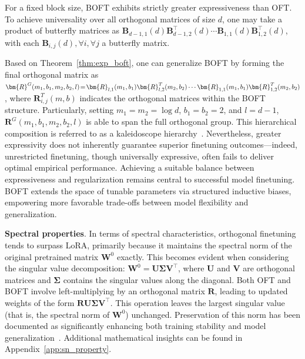 \begin{theorem}\label{thm:exp_boft}
    For a fixed block size, BOFT exhibits strictly greater expressiveness than OFT. To achieve universality over all orthogonal matrices of size $d$, one may take a product of butterfly matrices as $\bm{B}_{d-1,1}(d)\bm{B}^\top_{d-1,2}(d)\cdots\bm{B}_{1,1}(d)\bm{B}^\top_{1,2}(d)$, with each $\bm{B}_{i,j}(d),\forall i,\forall j$ a butterfly matrix.
\end{theorem}

Based on Theorem~\ref{thm:exp_boft}, one can generalize BOFT by forming the final orthogonal matrix as $\thickmuskip=2mu \medmuskip=2mu \bm{R}^G(m_1,b_1,m_2,b_2,l)=\bm{R}_{l,1}(m_1,b_1)\bm{R}_{l,2}^T(m_2,b_2)\cdots\bm{R}_{1,1}(m_1,b_1)\bm{R}_{1,2}^T(m_2,b_2)$, where $\bm{R}_{i,j}^T(m,b)$ indicates the orthogonal matrices within the BOFT structure. Particularly, setting $m_1=m_2=\log d$, $b_1=b_2=2$, and $l=d-1$, $\bm{R}^G(m_1,b_1,m_2,b_2,l)$ is able to span the full orthogonal group. This hierarchical composition is referred to as a kaleidoscope hierarchy~\cite{dao2019kaleidoscope}. Nevertheless, greater expressivity does not inherently guarantee superior finetuning outcomes—indeed, unrestricted finetuning, though universally expressive, often fails to deliver optimal empirical performance. Achieving a suitable balance between expressiveness and regularization remains central to successful model finetuning. BOFT extends the space of tunable parameters via structured inductive biases, empowering more favorable trade-offs between model flexibility and generalization.

\textbf{Spectral properties}. In terms of spectral characteristics, orthogonal finetuning tends to surpass LoRA, primarily because it maintains the spectral norm of the original pretrained matrix $\bm{W}^0$ exactly. This becomes evident when considering the singular value decomposition: $\bm{W}^0=\bm{U}\bm{\Sigma}\bm{V}^\top$, where $\bm{U}$ and $\bm{V}$ are orthogonal matrices and $\bm{\Sigma}$ contains the singular values along the diagonal. Both OFT and BOFT involve left-multiplying by an orthogonal matrix $\bm{R}$, leading to updated weights of the form $\bm{R}\bm{U}\bm{\Sigma}\bm{V}^\top$. This operation leaves the largest singular value (that is, the spectral norm of $\bm{W}^0$) unchanged. Preservation of this norm has been documented as significantly enhancing both training stability and model generalization~\cite{miyato2018spectral,yoshida2017spectral}. Additional mathematical insights can be found in Appendix~\ref{app:sn_property}.

